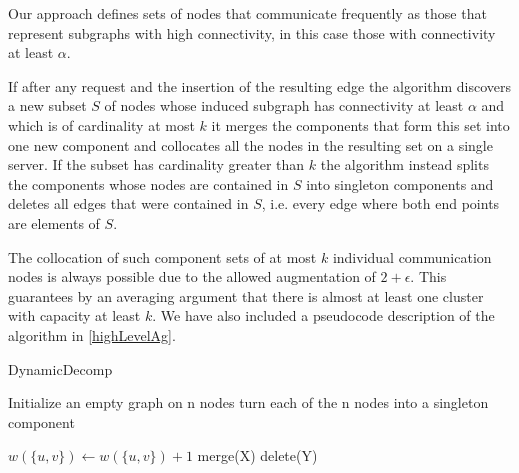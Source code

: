 \documentclass[xcolor=dvipsnames, tikz, 12pt]{article}
\newcommand{\nl}{\newline}
\theoremstyle{definition}
\begin{document}
	Our approach defines sets of nodes that communicate frequently as those that represent subgraphs with high connectivity, in this case those with connectivity at least $\alpha$.
	
	If after any request and the insertion of the resulting edge the algorithm discovers a new subset $S$ of nodes whose induced subgraph has connectivity at least $\alpha$ and which is of cardinality at most $k$ it merges the components that form this set into one new component and collocates all the nodes in the resulting set on a single server. If the subset has cardinality greater than $k$ the algorithm instead splits the components whose nodes are contained in $S$ into singleton components and deletes all edges that were contained in $S$, i.e. every edge where both end points are elements of $S$.
	
	The collocation of such component sets of at most $k$ individual communication nodes is always possible due to the allowed augmentation of $2+\epsilon$. This guarantees by an averaging argument that there is almost at least one cluster with capacity at least $k$. We have also included a pseudocode description of the algorithm in \cref{highLevelAg}.\nl\nl
	
	\begin{algorithm}
		\caption{DynamicDecomp}
		\label{highLevelAg}
		\begin{algorithmic}
			\STATE Initialize an empty graph on n nodes
			\STATE turn each of the n nodes into a singleton component
			
			\STATE $w(\{u,v\})\gets w(\{u,v\})+1$
			\ENDIF
			\STATE merge(X)
			\ENDIF
			\STATE delete(Y)
			\ENDIF	
			
			\ENDFOR
					
		\end{algorithmic}
	\end{algorithm}
	
\end{document}
